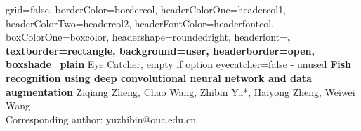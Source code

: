 \documentclass[a0paper,portrait]{baposter}
\begin{document}
\begin{poster}{
	grid=false,
	borderColor=bordercol,
	headerColorOne=headercol1,
	headerColorTwo=headercol2,
	headerFontColor=headerfontcol,
	boxColorOne=boxcolor,
	headershape=roundedright,
	headerfont=\Large\sf\bf,
	textborder=rectangle,
	background=user,
	headerborder=open,
  boxshade=plain
}
{
	Eye Catcher, empty if option eyecatcher=false - unused
}
{\sf\bf
	Fish recognition using deep convolutional neural network and data augmentation
}
{
	\vspace{1em} Ziqiang Zheng, Chao Wang, Zhibin Yu*, Haiyong Zheng, Weiwei Wang\\
	{\smaller Corresponding author: yuzhibin@ouc.edu.cn}
}
{

\setlength\fboxsep{0pt}
\setlength\fboxrule{0.5pt}
}


\end{poster}
\end{document}
